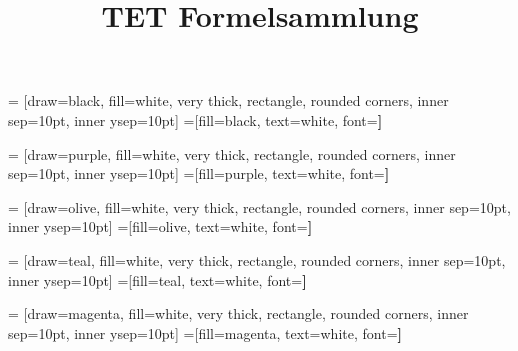 \documentclass[fontsize=8pt]{scrartcl}
\title{TET Formelsammlung}
\begin{document}
 = [draw=black, fill=white, very thick,
    rectangle, rounded corners, inner sep=10pt, inner ysep=10pt]
 =[fill=black, text=white, font=\bfseries]

 = [draw=purple, fill=white, very thick,
    rectangle, rounded corners, inner sep=10pt, inner ysep=10pt]
 =[fill=purple, text=white, font=\bfseries]

 = [draw=olive, fill=white, very thick,
    rectangle, rounded corners, inner sep=10pt, inner ysep=10pt]
 =[fill=olive, text=white, font=\bfseries]

 = [draw=teal, fill=white, very thick,
    rectangle, rounded corners, inner sep=10pt, inner ysep=10pt]
 =[fill=teal, text=white, font=\bfseries]

 = [draw=magenta, fill=white, very thick,
    rectangle, rounded corners, inner sep=10pt, inner ysep=10pt]
 =[fill=magenta, text=white, font=\bfseries]
\end{document}
